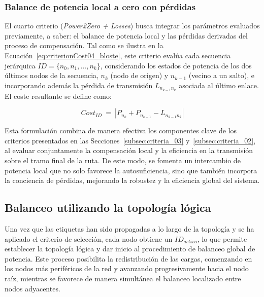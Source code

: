 \subsubsection{Balance de potencia local a cero con pérdidas}
\label{subsec:criteria_04}


El cuarto criterio (\textit{Power2Zero + Losses}) busca integrar los parámetros evaluados previamente, a saber: el balance de potencia local y las pérdidas derivadas del proceso de compensación. Tal como se ilustra en la Ecuación~\ref{eq:criterionCost04_bloste}, este criterio evalúa cada secuencia jerárquica \( ID = \{n_0, n_1, \dots, n_k\} \), considerando los estados de potencia de los dos últimos nodos de la secuencia, \( n_{k} \) (nodo de origen) y \( n_{k-1} \) (vecino a un salto), e incorporando además la pérdida de transmisión \( L_{n_{k-1}n_k} \) asociada al último enlace. El coste resultante se define como:

\begin{equation}\label{eq:criterionCost04_bloste}
      Cost_{ID} \: = \: |P_{n_k} + P_{n_{k-1}} - L_{n_{k-1}n_k}|
\end{equation}
\vspace{0.05cm}

Esta formulación combina de manera efectiva los componentes clave de los criterios presentados en las Secciones~\ref{subsec:criteria_03} y~\ref{subsec:criteria_02}, al evaluar conjuntamente la compensación local y la eficiencia en la transmisión sobre el tramo final de la ruta. De este modo, se fomenta un intercambio de potencia local que no solo favorece la autosuficiencia, sino que también incorpora la conciencia de pérdidas, mejorando la robustez y la eficiencia global del sistema.

\subsection{Balanceo utilizando la topología lógica}
\label{subsec:iterativeBalance}

Una vez que las etiquetas han sido propagadas a lo largo de la topología y se ha aplicado el criterio de selección, cada nodo obtiene un $ID_{activa}$, lo que permite establecer la topología lógica y dar inicio al procedimiento de balanceo global de potencia. Este proceso posibilita la redistribución de las cargas, comenzando en los nodos más periféricos de la red y avanzando progresivamente hacia el nodo raíz, mientras se favorece de manera simultánea el balanceo localizado entre nodos adyacentes.


